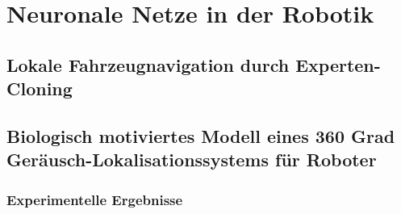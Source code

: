 \section{Neuronale Netze in der Robotik}
\subsection{Lokale Fahrzeugnavigation durch Experten-Cloning}
\subsection[360 Grad Geräusch-Lokalisationssystems für Roboter]{Biologisch motiviertes Modell eines 360 Grad Geräusch-Lokalisationssystems für Roboter}
\subsubsection*{Experimentelle Ergebnisse}
